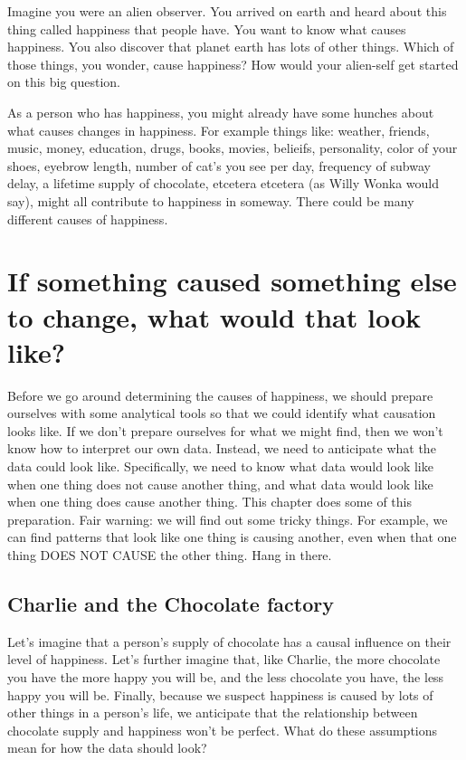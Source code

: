 \documentclass[]{book}
\begin{document}
Imagine you were an alien observer. You arrived on earth and heard about this thing called happiness that people have. You want to know what causes happiness. You also discover that planet earth has lots of other things. Which of those things, you wonder, cause happiness? How would your alien-self get started on this big question.

As a person who has happiness, you might already have some hunches about what causes changes in happiness. For example things like: weather, friends, music, money, education, drugs, books, movies, belieifs, personality, color of your shoes, eyebrow length, number of cat's you see per day, frequency of subway delay, a lifetime supply of chocolate, etcetera etcetera (as Willy Wonka would say), might all contribute to happiness in someway. There could be many different causes of happiness.

\hypertarget{if-something-caused-something-else-to-change-what-would-that-look-like}{%
\section{If something caused something else to change, what would that look like?}\label{if-something-caused-something-else-to-change-what-would-that-look-like}}

Before we go around determining the causes of happiness, we should prepare ourselves with some analytical tools so that we could identify what causation looks like. If we don't prepare ourselves for what we might find, then we won't know how to interpret our own data. Instead, we need to anticipate what the data could look like. Specifically, we need to know what data would look like when one thing does not cause another thing, and what data would look like when one thing does cause another thing. This chapter does some of this preparation. Fair warning: we will find out some tricky things. For example, we can find patterns that look like one thing is causing another, even when that one thing DOES NOT CAUSE the other thing. Hang in there.

\hypertarget{charlie-and-the-chocolate-factory}{%
\subsection{Charlie and the Chocolate factory}\label{charlie-and-the-chocolate-factory}}

Let's imagine that a person's supply of chocolate has a causal influence on their level of happiness. Let's further imagine that, like Charlie, the more chocolate you have the more happy you will be, and the less chocolate you have, the less happy you will be. Finally, because we suspect happiness is caused by lots of other things in a person's life, we anticipate that the relationship between chocolate supply and happiness won't be perfect. What do these assumptions mean for how the data should look?
\end{document}
